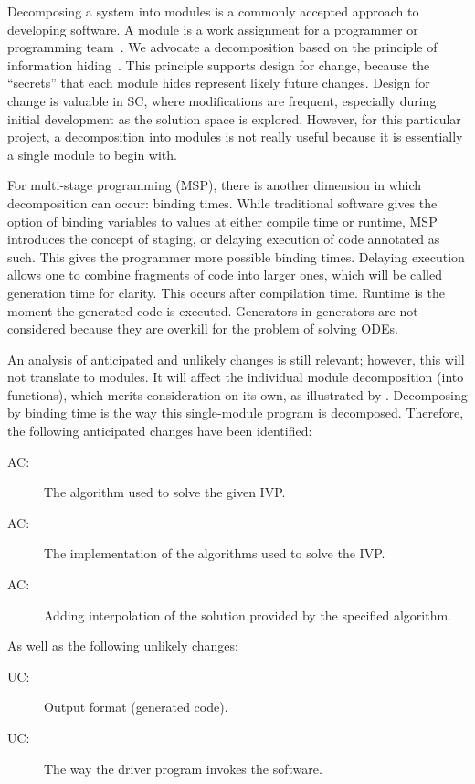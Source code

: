 \documentclass[12pt, titlepage]{article}
\newcounter{acnum}
\newcommand{\actheacnum}{AC\theacnum}
\newcounter{ucnum}
\newcommand{\uctheucnum}{UC\theucnum}
\begin{document}
Decomposing a system into modules is a commonly accepted approach to developing
software.  A module is a work assignment for a programmer or programming
team~\citep{ParnasEtAl1984}.  We advocate a decomposition
based on the principle of information hiding~\citep{Parnas1972a}.  This
principle supports design for change, because the ``secrets'' that each module
hides represent likely future changes.  Design for change is valuable in SC,
where modifications are frequent, especially during initial development as the
solution space is explored. However, for this particular project, a 
decomposition into modules is not really useful because it is essentially a 
single module to begin with.

For multi-stage programming (MSP), there is another dimension in which 
decomposition can occur: binding times. While traditional software gives the 
option of binding variables to values at either compile time or runtime, MSP 
introduces the concept of staging, or delaying execution of code annotated as 
such. This gives the programmer more possible binding times. Delaying execution 
allows one to combine fragments of code into larger ones, which will be called 
generation time for clarity. This occurs after compilation time. Runtime is the 
moment the generated code is executed. Generators-in-generators are not 
considered because they are overkill for the problem of solving ODEs. 

An analysis of anticipated and unlikely changes is still relevant; however, 
this will not translate to modules. It will affect the individual module 
decomposition (into functions), which merits consideration on its 
own, as illustrated by \cite{VanHilst:1996:DCD:250707.239109}. Decomposing by 
binding time is the way this single-module program is decomposed. Therefore, 
the following anticipated changes have been identified:
\begin{description}
  \item[ \actheacnum \label{acAlgorithm}:] The algorithm 
  used to solve the given IVP.
  \item[ \actheacnum \label{acImplementation}:] The 
  implementation of the algorithms used to solve the IVP.
  \item [ \actheacnum \label{acInterpolation}:] Adding 
  interpolation of the solution provided by the specified algorithm.
\end{description}

As well as the following unlikely changes:
\begin{description}
  \item[ \uctheucnum \label{ucOutput}:] Output format 
  (generated code).
  \item[ \uctheucnum \label{ucInput}:] The way the driver 
  program invokes the software.
\end{description}
\end{document}
